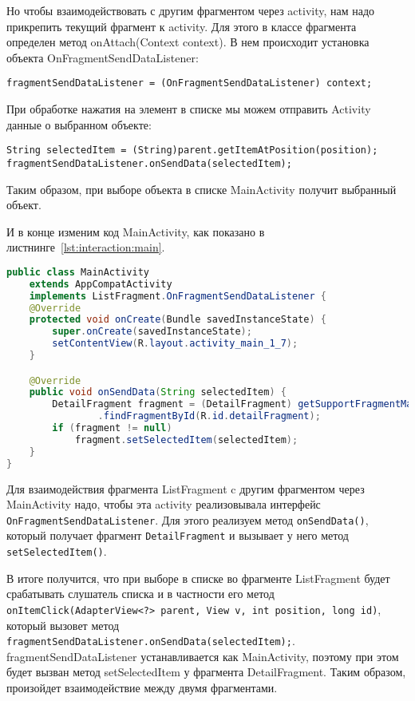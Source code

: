 Но чтобы взаимодействовать с другим фрагментом через activity, нам надо
прикрепить текущий фрагмент к activity. Для этого в классе фрагмента
определен метод onAttach(Context context). В нем происходит установка
объекта OnFragmentSendDataListener:

\begin{verbatim}
fragmentSendDataListener = (OnFragmentSendDataListener) context;
\end{verbatim}

При обработке нажатия на элемент в списке мы можем отправить Activity
данные о выбранном объекте:

\begin{verbatim}
String selectedItem = (String)parent.getItemAtPosition(position);
fragmentSendDataListener.onSendData(selectedItem);
\end{verbatim}

Таким образом, при выборе объекта в списке MainActivity получит
выбранный объект.

И в конце изменим код MainActivity, как показано
в листнинге~\ref{lst:interaction:main}.

\begin{lstlisting}[language=Java
	, caption=\leftline{}
	, label=lst:interaction:main
	]
public class MainActivity
	extends AppCompatActivity
	implements ListFragment.OnFragmentSendDataListener {
	@Override
	protected void onCreate(Bundle savedInstanceState) {
		super.onCreate(savedInstanceState);
		setContentView(R.layout.activity_main_1_7);
	}

	@Override
	public void onSendData(String selectedItem) {
		DetailFragment fragment = (DetailFragment) getSupportFragmentManager()
				.findFragmentById(R.id.detailFragment);
		if (fragment != null)
			fragment.setSelectedItem(selectedItem);
	}
}
\end{lstlisting}

Для взаимодействия фрагмента ListFragment c другим фрагментом через
MainActivity надо, чтобы эта activity реализовывала интерфейс
\texttt{OnFragmentSendDataListener}. Для этого реализуем метод
\texttt{onSendData()},
который получает фрагмент \texttt{DetailFragment} и вызывает у него метод
\texttt{setSelectedItem()}.\par
В итоге получится, что при выборе в списке во фрагменте ListFragment будет
срабатывать слушатель списка и в частности его метод
\texttt{onItemClick(AdapterView<?> parent, View v, int position, long id)},
который вызовет метод
\texttt{fragmentSendDataListener.onSendData(selectedItem);}.
fragmentSendDataListener устанавливается как MainActivity, поэтому при
этом будет вызван метод setSelectedItem у фрагмента DetailFragment. Таким
образом, произойдет взаимодействие между двумя фрагментами.

